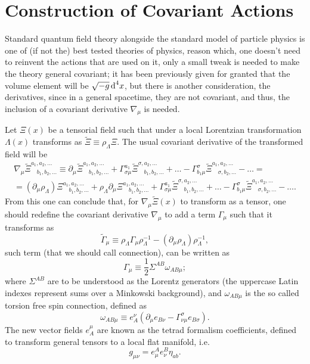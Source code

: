 \section{Construction of Covariant Actions}
Standard quantum field theory alongside the standard model of particle physics is one of (if not the) best tested theories of physics, reason which, one doesn't need to reinvent the actions that are used on it, only a small tweak is needed to make the theory general covariant; it has been previously given for granted that the  volume element will be $\sqrt{-g}\,\text{d}^4x$, but there is another consideration, the derivatives, since in a general spacetime, they are not covariant, and thus, the inclusion of a covariant derivative $\nabla_\mu$ is needed.

Let $\Xi(x)$ be a tensorial field such that under a local Lorentzian transformation $\Lambda(x)$ transforms as $\tilde{\Xi}\equiv\rho_\Lambda\Xi$. The usual covariant derivative of the transformed field will be
\begin{multline}\label{eq: covariant derivative general}
	\nabla_\mu\tilde\Xi^{a_1,a_2,\hdots}_{\quad b_1,b_2,\hdots}\equiv \partial_\mu\tilde{\Xi}^{a_1,a_2,\hdots}_{\quad b_1,b_2,\hdots}+\Gamma^{a_1}_{\sigma\mu}\tilde\Xi^{\sigma,a_2,\hdots}_{\quad b_1,b_2,\hdots}+\hdots-\Gamma^{\sigma}_{b_1\mu}\tilde\Xi^{a_1,a_2,\hdots}_{\quad \sigma,b_2,\hdots}-\hdots=\\
	=\left(\partial_\mu\rho_\Lambda\right)\Xi^{a_1,a_2,\hdots}_{\quad b_1,b_2,\hdots}+\rho_\Lambda\partial_\mu\Xi^{a_1,a_2,\hdots}_{\quad b_1,b_2,\hdots}+\Gamma^{a_1}_{\sigma\mu}\tilde\Xi^{\sigma,a_2,\hdots}_{\quad b_1,b_2,\hdots}+\hdots-\Gamma^{\sigma}_{b_1\mu}\tilde\Xi^{a_1,a_2,\hdots}_{\quad \sigma,b_2,\hdots}-\hdots.
\end{multline}
From this one can conclude that, for $\nabla_\mu\tilde{\Xi}(x)$ to transform as a tensor, one should redefine the covariant derivative $\nabla_\mu$ to add a term $\Gamma_\mu$ such that it transforms as
\begin{equation}\label{eq: connection transformation rule}
	\tilde{\Gamma}_\mu\equiv \rho_\Lambda\Gamma_\mu\rho_\Lambda^{-1}-\left(\partial_\mu\rho_\Lambda\right)\rho_\Lambda^{-1},
\end{equation}
such term (that we should call connection), can be written as
\begin{equation}\label{eq: connection}
	\Gamma_\mu\equiv \frac{1}{2}\Sigma^{AB}\omega_{AB\mu};
\end{equation}
where $\Sigma^{AB}$ are to be understood as the Lorentz generators (the uppercase Latin indexes represent sums over a Minkowski background), and $\omega_{AB\mu}$ is the so called torsion free spin connection, defined as
\begin{equation}
	\omega_{AB\mu}\equiv e^\nu_A\left(\partial_\mu e_{B\nu}-\Gamma^\sigma_{\nu\mu}e_{B\sigma}\right).
\end{equation}
The new vector fields $e^\mu_A$ are known as the tetrad formalism coefficients, defined to transform general tensors to a local flat manifold, i.e.
\begin{equation}
	g_{\mu\nu}=e^A_\mu e^B_\nu \eta_{ab}.
\end{equation}

